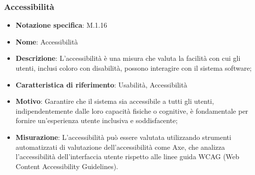 \subsubsection{Accessibilità}
\begin{itemize}
    \item \textbf{Notazione specifica}: M.1.16
    \item \textbf{Nome}: Accessibilità
    \item \textbf{Descrizione}: L'accessibilità è una misura che valuta la facilità con cui gli utenti, inclusi coloro con disabilità, possono interagire con il sistema software;
    \item \textbf{Caratteristica di riferimento}: Usabilità, Accessibilità
    \item \textbf{Motivo}: Garantire che il sistema sia accessibile a tutti gli utenti, indipendentemente dalle loro capacità fisiche o cognitive, è fondamentale per fornire un'esperienza utente inclusiva e soddisfacente;
    \item \textbf{Misurazione}: L'accessibilità può essere valutata utilizzando strumenti automatizzati di valutazione dell'accessibilità come Axe, che analizza l'accessibilità dell'interfaccia utente rispetto alle linee guida WCAG (Web Content Accessibility Guidelines).
\end{itemize}
